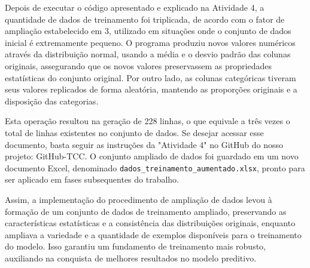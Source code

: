 Depois de executar o código apresentado e explicado na Atividade 4, a quantidade de dados de treinamento foi triplicada, de acordo com o fator de ampliação estabelecido em 3, utilizado em situações onde o conjunto de dados inicial é extremamente pequeno. O programa produziu novos valores numéricos através da distribuição normal, usando a média e o desvio padrão das colunas originais, assegurando que os novos valores preservassem as propriedades estatísticas do conjunto original. Por outro lado, as colunas categóricas tiveram seus valores replicados de forma aleatória, mantendo as proporções originais e a disposição das categorias. 

Esta operação resultou na geração de 228 linhas, o que equivale a três vezes o total de linhas existentes no conjunto de dados. Se desejar acessar esse documento, basta seguir as instruções da "Atividade 4" no GitHub do nosso projeto: GitHub-TCC. O conjunto ampliado de dados foi guardado em um novo documento Excel, denominado \texttt{dados\_treinamento\_aumentado.xlsx}, pronto para ser aplicado em fases subsequentes do trabalho. 

Assim, a implementação do procedimento de ampliação de dados levou à formação de um conjunto de dados de treinamento ampliado, preservando as características estatísticas e a consistência das distribuições originais, enquanto ampliava a variedade e a quantidade de exemplos disponíveis para o treinamento do modelo. Isso garantiu um fundamento de treinamento mais robusto, auxiliando na conquista de melhores resultados no modelo preditivo.

